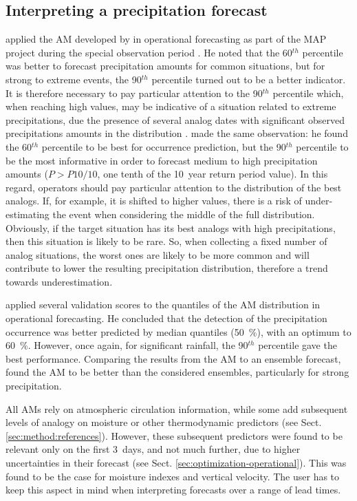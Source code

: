 \documentclass[review]{elsarticle}
\begin{document}
\subsection{Interpreting a precipitation forecast}
\label{sec:interpreting}

\citet{Djerboua2001} applied the AM developed by \citet{Guilbaud1997} in operational forecasting as part of the MAP project \citep[\textit{Mesoscale Alpine Programme}, see][]{Binder1996} during the special observation period \citep{Bougeault2001}. He noted that the 60$^{th}$ percentile was better to forecast precipitation amounts for common situations, but for strong to extreme events, the 90$^{th}$ percentile turned out to be a better indicator. It is therefore necessary to pay particular attention to the 90$^{th}$ percentile which, when reaching high values, may be indicative of a situation related to extreme precipitations, due the presence of several analog dates with significant observed precipitations amounts in the distribution \citep{Djerboua2001}. \citet{Bontron2004} made the same observation: he found the 60$^{th}$ percentile to be best for occurrence prediction, but the 90$^{th}$ percentile to be the most informative in order to forecast medium to high precipitation amounts ($P > P10/10$, one tenth of the 10~year return period value). In this regard, operators should pay particular attention to the distribution of the best analogs. If, for example, it is shifted to higher values, there is a risk of under-estimating the event when considering the middle of the full distribution. Obviously, if the target situation has its best analogs with high precipitations, then this situation is likely to be rare. So, when collecting a fixed number of analog situations, the worst ones are likely to be more common and will contribute to lower the resulting precipitation distribution, therefore a trend towards underestimation.


\citet{Marty2010} applied several validation scores to the quantiles of the AM distribution in operational forecasting. He concluded that the detection of the precipitation occurrence was better predicted by median quantiles (50~\%), with an optimum to 60~\%. However, once again, for significant rainfall, the 90$^{th}$ percentile gave the best performance. Comparing the results from the AM to an ensemble forecast, \citet{Marty2010} found the AM to be better than the considered ensembles, particularly for strong precipitation.

All AMs rely on atmospheric circulation information, while some add subsequent levels of analogy on moisture or other thermodynamic predictors (see Sect. \ref{sec:method:references}). However, these subsequent predictors were found to be relevant only on the first 3~days, and not much further, due to higher uncertainties in their forecast (see Sect. \ref{sec:optimization-operational}). This was found to be the case for moisture indexes and vertical velocity. The user has to keep this aspect in mind when interpreting forecasts over a range of lead times.
\end{document}

